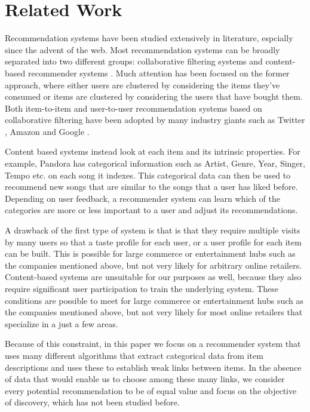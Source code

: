 \section{Related Work}

Recommendation systems have been studied extensively in literature, espcially since the advent of the web. Most recommendation systems can be broadly separated into two different groups: collaborative filtering systems and content-based recommender systems \cite{almazro2010survey}. Much attention has been focused on the former approach, where either users are clustered by considering the items they've consumed or items are clustered by considering the users that have bought them. Both item-to-item and user-to-user recommendation systems based on collaborative filtering have been adopted by many industry giants such as Twitter \cite{twitter-collab-filtering}, Amazon \cite{amazon-collab-filtering} and Google \cite{google-collab-filtering}. 

Content based systems instead look at each item and its intrinsic properties. For example, Pandora has categorical information such as Artist, Genre, Year, Singer, Tempo etc. on each song it indexes. This categorical data can then be used to recommend new songs that are similar to the songs that a user has liked before. Depending on user feedback, a recommender system can learn which of the categories are more or less important to a user and adjust its recommendations.

A drawback of the first type of system is that is that they require multiple visits by many users so that a taste profile for each user, or a user profile for each item can be built. This is possible for large commerce or entertainment hubs such as the companies mentioned above, but not very likely for arbitrary online retailers. Content-based systems are unsuitable for our purposes as well, because they also require significant user participation to train the underlying system. These conditions are possible to meet for large commerce or entertainment hubs such as the companies mentioned above, but not very likely for most online retailers that specialize in a just a few areas.

Because of this constraint, in this paper we focus on a recommender system that uses many different algorithms that extract categorical data from item descriptions and uses these to establish weak links between items. In the absence of data that would enable us to choose among these many links, we consider every potential recommendation to be of equal value and focus on the objective of discovery, which has not been studied before.

